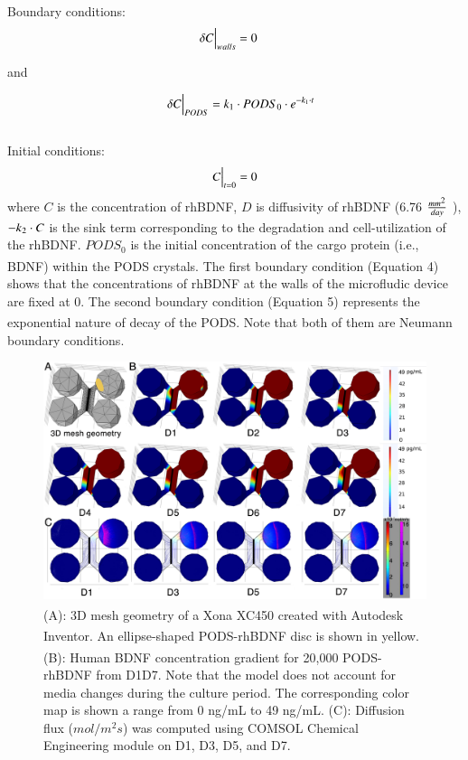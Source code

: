 \documentclass[review]{elsarticle}
\begin{document}
Boundary conditions:
\begin{equation}
\delta C \Big{|}_{walls}= 0\quad 
\end{equation}

\begin{center}
and
\end{center}

\begin{equation}
\quad\delta C\Big{|}_{PODS}
=k_1 \cdot PODS_0 \cdot e^{-k_1 \cdot t}
\end{equation}
\\
Initial conditions: 
\begin{equation}
C\Big{|}_{t=0} = 0
\end{equation}
where $C$ is the concentration of rhBDNF, $D$ is diffusivity of rhBDNF (6.76 $\frac{mm\textsuperscript{2}}{day} $ \cite{Stroh2004}), $-k\textsubscript{2}\cdot C$ is the sink term corresponding to the degradation and cell-utilization of the rhBDNF. $PODS_{0}$ is the initial concentration of the cargo protein (i.e., BDNF) within the PODS\textsuperscript{\textregistered} crystals. The first boundary condition (Equation 4) shows that the concentrations of rhBDNF at the walls of the microfludic device are fixed at 0. The second boundary condition (Equation 5) represents the exponential nature of decay of the PODS\textsuperscript{\textregistered}. Note that both of them are Neumann boundary conditions. 

\begin{figure}
\begin{center}
	\includegraphics[width=13cm]{Fig_5.jpg}
\end{center}
\caption{(A): 3D mesh geometry of a Xona\textsuperscript{\texttrademark} XC450 created with Autodesk Inventor. An ellipse-shaped PODS\textsuperscript{\textregistered}-rhBDNF disc is shown in yellow. (B): Human BDNF concentration gradient for 20,000 PODS\textsuperscript{\textregistered}-rhBDNF from D1\textendash D7. Note that the model does not account for media changes during the culture period. The corresponding color map is shown a range from 0 ng/mL to 49 ng/mL. (C): Diffusion flux ($mol/m^{2}s$) was computed using COMSOL Chemical Engineering module on D1, D3, D5, and D7.}
\end{figure}
\end{document}
